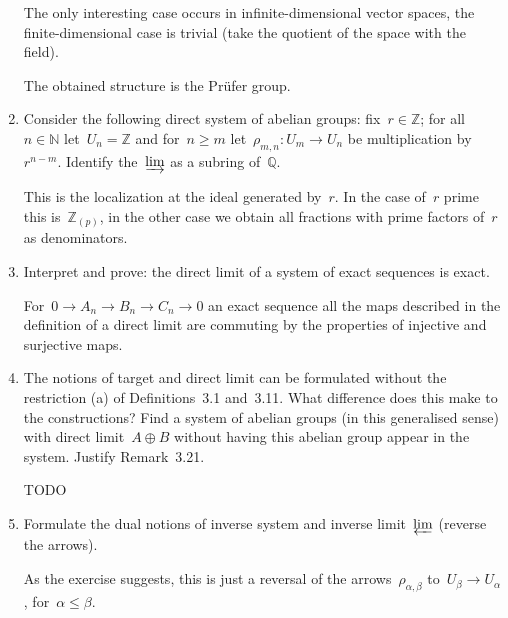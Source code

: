 \documentclass[a4paper,11pt,oneside,openany,article]{memoir}
\begin{document}
\begin{enumerate}
\begin{solution}
      The only interesting case occurs in infinite-dimensional vector spaces, the finite-dimensional case is trivial (take the quotient of the space with the field).

      The obtained structure is the Pr\"ufer group.
    \end{solution}

  \item Consider the following direct system of abelian groups: fix~$r\in\mathbb{Z}$; for all~$n\in\mathbb{N}$ let~$U_n=\mathbb{Z}$ and for~$n\geq m$ let~$\rho_{m,n}\colon U_m\to U_n$ be multiplication by~$r^{n-m}$. Identify the~$\varinjlim$ as a subring of~$\mathbb{Q}$.

    \begin{solution}
      This is the localization at the ideal generated by~$r$. In the case of~$r$ prime this is~$\mathbb{Z}_{(p)}$, in the other case we obtain all fractions with prime factors of~$r$ as denominators.
    \end{solution}

  \item Interpret and prove: the direct limit of a system of exact sequences is exact.

    \begin{solution}
      For~$0\to A_n\to B_n\to C_n\to 0$ an exact sequence all the maps described in the definition of a direct limit are commuting by the properties of injective and surjective maps.
    \end{solution}

  \item The notions of target and direct limit can be formulated without the restriction (a) of Definitions~3.1 and~3.11. What difference does this make to the constructions? Find a system of abelian groups (in this generalised sense) with direct limit~$A\oplus B$ without having this abelian group appear in the system. Justify Remark~3.21.

    \begin{solution}
      TODO
    \end{solution}

  \item Formulate the dual notions of inverse system and inverse limit~$\varprojlim$ (reverse the arrows).

    \begin{solution}
      As the exercise suggests, this is just a reversal of the arrows~$\rho_{\alpha,\beta}$ to~$U_\beta\to U_\alpha$, for~$\alpha\leq\beta$.
    \end{solution}
    

\end{enumerate}
\end{document}
